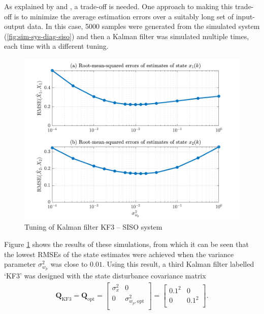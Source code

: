 As explained by \cite{andersson_adaptive_1985} and \cite{robertson_detection_1995}, a trade-off is needed. One approach to making this trade-off is to minimize the average estimation errors over a suitably long set of input-output data. In this case, 5000 samples were generated from the simulated system (\ref{fig:sim-sys-diag-siso}) and then a Kalman filter was simulated multiple times, each time with a different tuning. 
\begin{figure}[htp]
	\centering
	\includegraphics[width=13cm]{images/rod_obs_sim1_3KF_Q_seed_6.pdf}
	\caption{Tuning of Kalman filter KF3 – SISO system}
	\label{fig:sim-sys-siso-KF3-tuning}
\end{figure}
Figure \ref{fig:sim-sys-siso-KF3-tuning} shows the results of these simulations, from which it can be seen that the lowest \gls{RMSE}s of the state estimates were achieved when the variance parameter $\sigma_{w_p}^2$ was close to $0.01$. Using this result, a third Kalman filter labelled `KF3' was designed with the state disturbance covariance matrix
%
\begin{equation} \label{eq:sim-sys-siso-KF3-Q}
	\begin{aligned}
		\mathbf{Q}_{\text{KF3}}=\mathbf{Q}_{\text{opt}}=\begin{bmatrix}
			\sigma_{x}^2 & 0 \\
			0 & \sigma_{w_p,\text{opt}}^2 \\
		\end{bmatrix}=\begin{bmatrix}
			0.1^2 & 0 \\
			0 & 0.1^2 \\
		\end{bmatrix}.
	\end{aligned}
\end{equation}

